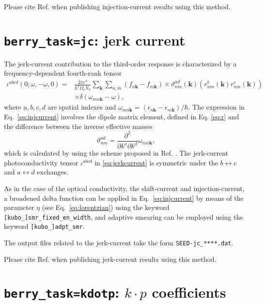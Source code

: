 Please cite Ref. \cite{ruiz-ArXiv2023} when publishing injection-current results using this method.

\section{{\tt berry\_task=jc}: jerk current}

The jerk-current contribution to the third-order response
is characterized by a frequency-dependent fourth-rank tensor \cite{ruiz-ArXiv2023}
\begin{equation}\label{eq:jerkcurrent}
\begin{split}
\iota^{abcd}(0;\omega,-\omega, 0)=&\frac{2\pi e^4}{\hbar^3 \Omega_c N_k}
\sum_{\bm{k}} \sum_{n,m}(f_{n\bm{k}}-f_{m\bm{k}})
\times
\vartheta^{ad}_{nm}(\bm{k})\left(r^b_{ nm}(\bm{k})r^c_{mn}(\bm{k})\right)\\
&\times \delta(\omega_{mn\bm{k}}-\omega),
\end{split}
\end{equation}
where $a,b,c, d$ are spatial indexes
and $\omega_{mn\bm{k}}=(\epsilon_{n\bm{k}}-\epsilon_{m\bm{k}})/\hbar$.
The expression in Eq.~\ref{eq:injcurrent} involves 
the dipole matrix element, defined in Eq. \eqref{eq:r}
and the difference between the inverse effective masses
\begin{equation}
	\label{eq:eff_mass}
	\vartheta^{ad}_{nm} = \frac{\partial^2}{\partial k^a \partial k^d} \omega_{nm\bm{k}},
\end{equation}
which is calculated by using the scheme proposed in Ref. \cite{yates-prb07}.
The jerk-current photoconductivity tensor $\iota^{abcd}$ in \eqref{eq:jerkcurrent} is symmetric under the $b\leftrightarrow c$ and $a\leftrightarrow d$ exchanges.

As in the case of the optical conductivity, the shift-current and injection-current, a broadened delta function can be 
applied in Eq.~\ref{eq:injcurrent} by means of the parameter
$\eta$ (see Eq.~\ref{eq:lorentzian}) using the keyword 
{\tt[kubo\_]smr\_fixed\_en\_width}, and adaptive smearing can 
be employed using the keyword {\tt [kubo\_]adpt\_smr}. 

The output files related to the jerk-current take the form \verb|SEED-jc_****.dat|. 

Please cite Ref. \cite{ruiz-ArXiv2023} when publishing jerk-current results using this method.


\section{{\tt berry\_task=kdotp}: $k\cdot p$ coefficients}
\label{sec:kdotp}

